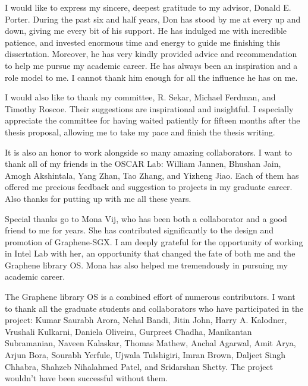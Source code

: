I would like to express my sincere, deepest gratitude to my advisor, Donald E. Porter. During the past six and half years, Don has stood by me at every up and down, giving me every bit of his support. He has indulged me with incredible patience, and invested enormous time and energy to guide me finishing this dissertation.
Moreover, he has very kindly provided advice and recommendation to help me pursue my academic career. He has always been an inspiration and a role model to me. I cannot thank him enough for all the influence he has on me.

I would also like to thank my committee, R. Sekar, Michael Ferdman, and Timothy Roscoe. Their suggestions are inspirational and insightful. I especially appreciate the committee for having waited patiently for fifteen months after the thesis proposal, allowing me to take my pace and finish the thesis writing.

It is also an honor to work alongside so many amazing collaborators. I want to thank all of my friends in the OSCAR Lab: William Jannen, Bhushan Jain, Amogh Akshintala, Yang Zhan, Tao Zhang, and Yizheng Jiao. Each of them has offered me precious feedback and suggestion to projects in my graduate career. Also thanks for putting up with me all these years.

Special thanks go to Mona Vij, who has been both a collaborator and a good friend to me for years. She has contributed significantly to the design and promotion of Graphene-SGX. I am deeply grateful for the opportunity of working in Intel Lab with her, an opportunity that changed the fate of both me and the Graphene library OS. Mona has also helped me tremendously in pursuing my academic career. 

The Graphene library OS is a combined effort of numerous contributors. I want to thank all the graduate students and collaborators who have participated in the project: Kumar Saurabh Arora, Nehal Bandi, Jitin John, Harry A. Kalodner, Vrushali Kulkarni, Daniela Oliveira, Gurpreet Chadha, Manikantan Subramanian, Naveen Kalaskar, Thomas Mathew, Anchal Agarwal, Amit Arya, Arjun Bora, Sourabh Yerfule, Ujwala Tulshigiri, Imran Brown, Daljeet Singh Chhabra, Shahzeb Nihalahmed Patel, and Sridarshan Shetty. The project wouldn't have been successful without them.




